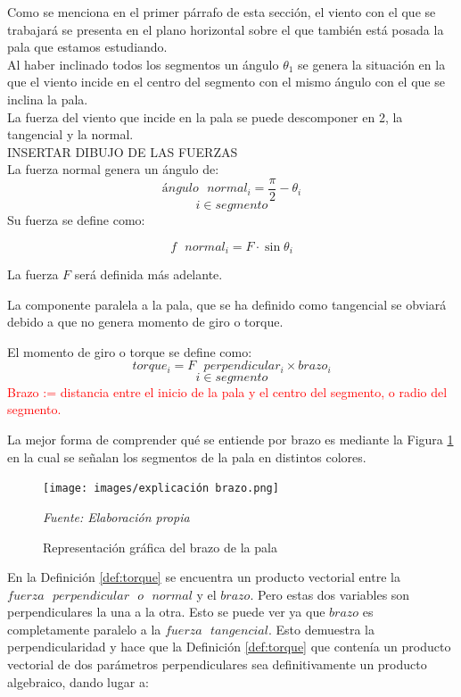 Como se menciona en el primer párrafo de esta sección, el viento con el que se trabajará se presenta en el plano horizontal sobre el que también está posada la pala que estamos estudiando.\\


Al haber inclinado todos los segmentos un ángulo $ \theta_1 $ se genera la situación en la que el viento incide en el centro del segmento con el mismo ángulo con el que se inclina la pala. \\

La fuerza del viento que incide en la pala se puede descomponer en 2, la tangencial y la normal. \\

 INSERTAR DIBUJO DE LAS FUERZAS \\
 
 La fuerza normal genera un ángulo de:
 $$ ángulo \text{ } normal_i = \dfrac{\pi}{2} - \theta_i $$
 $$ i \in segmento$$
 Su fuerza se define como:
 \begin{definicion}
  $$ f \text{ } normal_i = F \cdot \sin{\theta_i}$$
  \label{def:fuerza_normal}
 \end{definicion}

 
 

 La fuerza $F$ será definida más adelante.
 
 La componente paralela a la pala, que se ha definido como tangencial se obviará debido a que no genera momento de giro o torque. 
 
 \begin{definicion}
El momento de giro o torque se define como:
 $$ torque_i = F \text{ } perpendicular_i \times brazo_i$$
 $$ i \in segmento$$
 \label{def:torque} %
 \textcolor{red}{Brazo := distancia entre el inicio de la pala y el centro del segmento, o radio del segmento.} \\
 \end{definicion}

 La mejor forma de comprender qué se entiende por brazo es mediante la Figura \ref{fig:exp_brazo} en la cual se señalan los segmentos de la pala en distintos colores.
 
     \textbf{}
    \begin{figure}[H]
    \centering
    \texttt{[image: images/explicación brazo.png]}
    \caption{Representación gráfica del brazo de la pala}
    \label{fig:exp_brazo}
    \textit{Fuente: Elaboración propia}
\end{figure}

 
 En la Definición \ref{def:torque} se encuentra un producto vectorial entre la $fuerza  \text{ }perpendicular \text{ } o \text{ } normal$ y el $brazo$. Pero estas dos variables son perpendiculares la una a la otra. Esto se puede ver ya que $brazo$ es completamente paralelo a la $fuerza \text{ } tangencial$. Esto demuestra la perpendicularidad y hace que la Definición \ref{def:torque} que contenía un producto vectorial de dos parámetros perpendiculares sea definitivamente un producto algebraico, dando lugar a:
 
